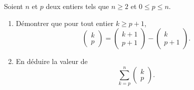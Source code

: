 Soient $n$ et $p$ deux entiers tels que $n\geqslant 2$ et $0\leqslant p \leqslant n$. 
\begin{enumerate}
      \item Démontrer que pour tout entier $k\geqslant p+1$, $$\begin{pmatrix} k \\ p \end{pmatrix} =\begin{pmatrix} k+1 \\ p+1 \end{pmatrix}-\begin{pmatrix} k \\ p+1 \end{pmatrix}.$$
      \item En déduire la valeur de $$\sum_{k=p}^n \begin{pmatrix} k \\ p \end{pmatrix}.$$
     \end{enumerate}